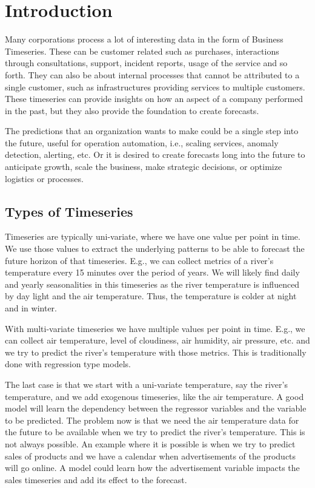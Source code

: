 \section{Introduction}

Many corporations process a lot of interesting data in the form of Business Timeseries. These can be customer related such as purchases, interactions through consultations, support, incident reports, usage of the service and so forth. They can also be about internal processes that cannot be attributed to a single customer, such as infrastructures providing services to multiple customers. These timeseries can provide insights on how an aspect of a company performed in the past, but they also provide the foundation to create forecasts. 

The predictions that an organization wants to make could be a single step into the future, useful for operation automation, i.e., scaling services, anomaly detection, alerting, etc. Or it is desired to create forecasts long into the future to anticipate growth, scale the business, make strategic decisions, or optimize logistics or processes.

\subsection{Types of Timeseries}

Timeseries are typically uni-variate, where we have one value per point in time. We use those values to extract the underlying patterns to be able to forecast the future horizon of that timeseries. E.g., we can collect metrics of a river's temperature every 15 minutes over the period of years. We will likely find daily and yearly seasonalities in this timeseries as the river temperature is influenced by day light and the air temperature. Thus, the temperature is colder at night and in winter.

With multi-variate timeseries we have multiple values per point in time. E.g., we can collect air temperature, level of cloudiness, air humidity, air pressure, etc. and we try to predict the river's temperature with those metrics. This is traditionally done with regression type models.

The last case is that we start with a uni-variate temperature, say the river's temperature, and we add exogenous timeseries, like the air temperature. A good model will learn the dependency between the regressor variables and the variable to be predicted. The problem now is that we need the air temperature data for the future to be available when we try to predict the river's temperature. This is not always possible. An example where it is possible is when we try to predict sales of products and we have a calendar when advertisements of the products will go online. A model could learn how the advertisement variable impacts the sales timeseries and add its effect to the forecast.

